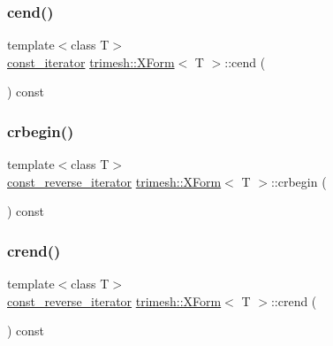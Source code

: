 \mbox{\label{classtrimesh_1_1XForm_a1321a5e276125d12ad03ba047c5156ce}} 
\subsubsection{\texorpdfstring{cend()}{cend()}}
{\footnotesize\ttfamily template$<$class T$>$ \\
\hyperlink{classtrimesh_1_1XForm_af342cefd0ecc382861c2d89f24423d71}{const\+\_\+iterator} \hyperlink{classtrimesh_1_1XForm}{trimesh\+::\+X\+Form}$<$ T $>$\+::cend (\begin{DoxyParamCaption}{ }\end{DoxyParamCaption}) const\hspace{0.3cm}{\ttfamily [inline]}}

\mbox{\label{classtrimesh_1_1XForm_a91980e192ae3e19f57ccb1cde5d00953}} 
\subsubsection{\texorpdfstring{crbegin()}{crbegin()}}
{\footnotesize\ttfamily template$<$class T$>$ \\
\hyperlink{classtrimesh_1_1XForm_a00d4231576ef7499e29885da090e807f}{const\+\_\+reverse\+\_\+iterator} \hyperlink{classtrimesh_1_1XForm}{trimesh\+::\+X\+Form}$<$ T $>$\+::crbegin (\begin{DoxyParamCaption}{ }\end{DoxyParamCaption}) const\hspace{0.3cm}{\ttfamily [inline]}}

\mbox{\label{classtrimesh_1_1XForm_acc0ac28eceb88802b93ebe4013653e26}} 
\subsubsection{\texorpdfstring{crend()}{crend()}}
{\footnotesize\ttfamily template$<$class T$>$ \\
\hyperlink{classtrimesh_1_1XForm_a00d4231576ef7499e29885da090e807f}{const\+\_\+reverse\+\_\+iterator} \hyperlink{classtrimesh_1_1XForm}{trimesh\+::\+X\+Form}$<$ T $>$\+::crend (\begin{DoxyParamCaption}{ }\end{DoxyParamCaption}) const\hspace{0.3cm}{\ttfamily [inline]}}

